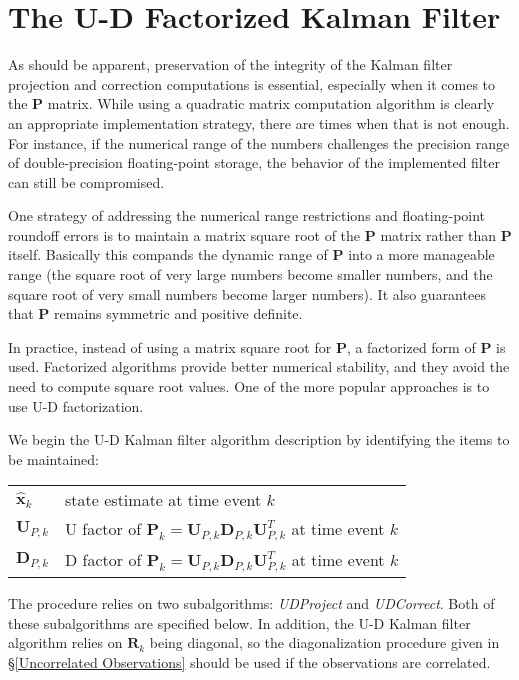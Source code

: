 \section{The U-D Factorized Kalman Filter}
\label{The U-D Factorized Kalman Filter}

As should be apparent, preservation of the integrity of the Kalman filter projection and
correction computations is essential, especially when it comes to the $\mathbf{P}$ matrix.
While using a quadratic matrix computation algorithm is clearly an appropriate
implementation strategy, there are times when that is not enough. For instance, if the
numerical range of the numbers challenges the precision range of double-precision
floating-point storage, the behavior of the implemented filter can still be compromised.

One strategy of addressing the numerical range restrictions and floating-point roundoff
errors is to maintain a matrix square root of the $\mathbf{P}$ matrix rather than
$\mathbf{P}$ itself. Basically this compands the dynamic range of $\mathbf{P}$ into a
more manageable range (the square root of very large numbers become smaller numbers, and
the square root of very small numbers become larger numbers). It also guarantees that
$\mathbf{P}$ remains symmetric and positive definite.

In practice, instead of using a matrix square root for $\mathbf{P}$, a factorized form of
$\mathbf{P}$ is used. Factorized algorithms provide better numerical stability, and they
avoid the need to compute square root values. One of the more popular approaches is to use
U-D factorization.

We begin the U-D Kalman filter algorithm description by identifying the items to be
maintained:

\begin{tabular}{l l}
$\hat{\mathbf{x}}_k$ & state estimate at time event $k$ \\
$\mathbf{U}_{P,k}$   & U factor of $\mathbf{P}_k = \mathbf{U}_{P,k} \mathbf{D}_{P,k} \mathbf{U}_{P,k}^T$ at time event $k$ \\
$\mathbf{D}_{P,k}$   & D factor of $\mathbf{P}_k = \mathbf{U}_{P,k} \mathbf{D}_{P,k} \mathbf{U}_{P,k}^T$ at time event $k$
\end{tabular}

The procedure relies on two subalgorithms: \textit{UDProject} and \textit{UDCorrect}.
Both of these subalgorithms are specified below. In addition, the U-D Kalman filter
algorithm relies on $\mathbf{R}_k$ being diagonal, so the diagonalization procedure given
in \S\ref{Uncorrelated Observations} should be used if the observations are correlated.

